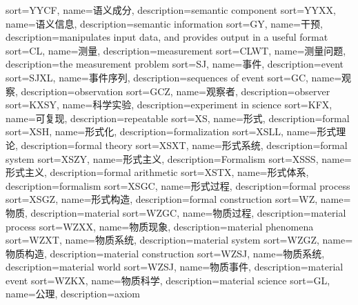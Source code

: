 {
  sort=YYCF,
  name=语义成分,
  description={semantic component}
}
{
  sort=YYXX,
  name=语义信息,
  description={semantic information}
}
{
  sort=GY,
  name=干预,
  description={manipulates input data, and provides output in a useful format}
}
{
  sort=CL,
  name=测量,
  description={measurement}
}
{
  sort=CLWT,
  name=测量问题,
  description={the measurement problem}
}
{
  sort=SJ,
  name=事件,
  description={event}
}
{
  sort=SJXL,
  name=事件序列,
  description={sequences of event}
}
{
  sort=GC,
  name=观察,
  description={observation}
}
{
  sort=GCZ,
  name=观察者,
  description={observer}
}
{
  sort=KXSY,
  name=科学实验,
  description={experiment in science}
}
{
  sort=KFX,
  name=可复现,
  description={repeatable}
}
{
  sort=XS,
  name=形式,
  description={formal}
}
{
  sort=XSH,
  name=形式化,
  description={formalization}
}
{
  sort=XSLL,
  name=形式理论,
  description={formal theory}
}
{
  sort=XSXT,
  name=形式系统,
  description={formal system}
}
{
  sort=XSZY,
  name=形式主义,
  description={Formalism}
}
{
  sort=XSSS,
  name=形式主义,
  description={formal arithmetic}
}
{
  sort=XSTX,
  name=形式体系,
  description={formalism}
}
{
  sort=XSGC,
  name=形式过程,
  description={formal process}
}
{
  sort=XSGZ,
  name=形式构造,
  description={formal construction}
}
{
  sort=WZ,
  name=物质,
  description={material}
}
{
  sort=WZGC,
  name=物质过程,
  description={material process}
}
{
  sort=WZXX,
  name=物质现象,
  description={material phenomena}
}
{
  sort=WZXT,
  name=物质系统,
  description={material system}
}
{
  sort=WZGZ,
  name=物质构造,
  description={material construction}
}
{
  sort=WZSJ,
  name=物质系统,
  description={material world}
}
{
  sort=WZSJ,
  name=物质事件,
  description={material event}
}
{
  sort=WZKX,
  name=物质科学,
  description={material science}
}
{
  sort=GL,
  name=公理,
  description={axiom}
}
